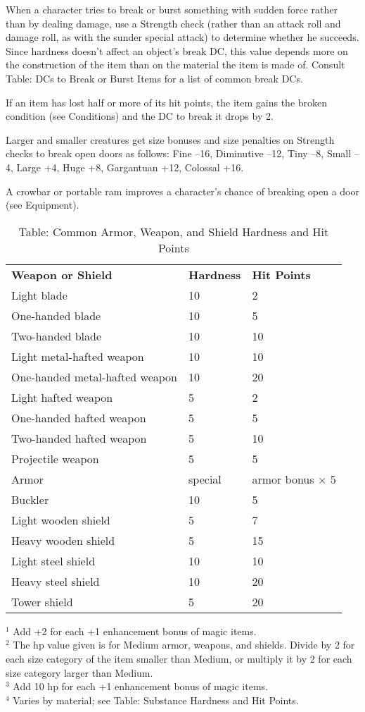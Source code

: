 			
When a character tries to break or burst something with sudden force rather than by dealing damage, use a Strength check (rather than an attack roll and damage roll, as with the sunder special attack) to determine whether he succeeds. Since hardness doesn't affect an object's break DC, this value depends more on the construction of the item than on the material the item is made of. Consult Table: DCs to Break or Burst Items for a list of common break DCs.
			
If an item has lost half or more of its hit points, the item gains the broken condition (see Conditions) and the DC to break it drops by 2.
			
Larger and smaller creatures get size bonuses and size penalties on Strength checks to break open doors as follows: Fine --16, Diminutive --12, Tiny --8, Small --4, Large +4, Huge +8, Gargantuan +12, Colossal +16.
			
A crowbar or portable ram improves a character's chance of breaking open a door (see Equipment).

\begin{table}[]
\sffamily
\caption{Table: Common Armor, Weapon, and Shield Hardness and Hit Points}
\begin{tabular}{lll}
\textbf{Weapon or Shield} & \textbf{Hardness} & \textbf{Hit Points}\\
Light blade & 10 & 2 \\
 One-handed blade & 10 & 5 \\
 Two-handed blade & 10 & 10 \\
 Light metal-hafted weapon & 10 & 10 \\
 One-handed metal-hafted weapon & 10 & 20 \\
 Light hafted weapon & 5 & 2 \\
 One-handed hafted weapon & 5 & 5 \\
 Two-handed hafted weapon & 5 & 10 \\
 Projectile weapon & 5 & 5 \\
 Armor & special & armor bonus $\times$ 5 \\
 Buckler & 10 & 5 \\
 Light wooden shield & 5 & 7 \\
 Heavy wooden shield & 5 & 15 \\
 Light steel shield & 10 & 10 \\
 Heavy steel shield & 10 & 20 \\
 Tower shield & 5 & 20\\
\end{tabular}
\(^{1}\) Add +2 for each +1 enhancement bonus of magic items.\\
\(^{2}\) The hp value given is for Medium armor, weapons, and shields. Divide by 2 for each size category of the item smaller than Medium, or multiply it by 2 for each size category larger than Medium.\\
\(^{3}\) Add 10 hp for each +1 enhancement bonus of magic items.\\
\(^{4}\) Varies by material; see Table: Substance Hardness and Hit Points.\\					
\end{table}
        	
